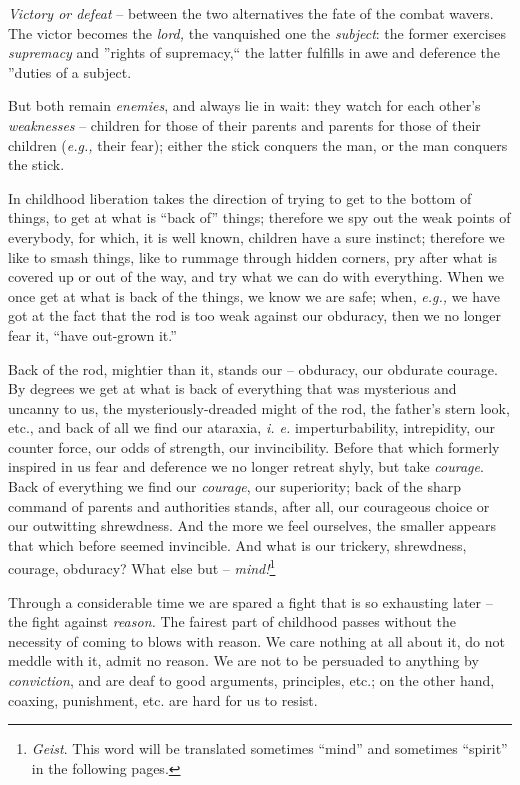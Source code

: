 \documentclass[12pt,a4paper]{book}
\begin{document}
\textit{Victory or defeat} -- between the two alternatives the fate of the 
combat wavers. The victor becomes the \textit{lord,} the vanquished one the 
\textit{subject}: the former exercises \textit{supremacy} and ''rights of 
supremacy,`` the latter fulfills in awe and deference the ''duties of a 
subject.

But both remain \textit{enemies}, and always lie in wait: they watch for each 
other's \textit{weaknesses} -- children for those of their parents and parents 
for those of their children (\textit{e.g.,} their fear); either the stick 
conquers the man, or the man conquers the stick.

In childhood liberation takes the direction of trying to get to the bottom of 
things, to get at what is ``back of'' things; therefore we spy out the weak 
points of everybody, for which, it is well known, children have a sure 
instinct; therefore we like to smash things, like to rummage through hidden 
corners, pry after what is covered up or out of the way, and try what we can 
do with everything. When we once get at what is back of the things, we know we 
are safe; when, \textit{e.g.,} we have got at the fact that the rod is too 
weak against our obduracy, then we no longer fear it, ``have out-grown it.''

Back of the rod, mightier than it, stands our -- obduracy, our obdurate 
courage. By degrees we get at what is back of everything that was mysterious 
and uncanny to us, the mysteriously-dreaded might of the rod, the father's 
stern look, etc., and back of all we find our ataraxia, \textit{i. e.} 
imperturbability, intrepidity, our counter force, our odds of strength, our 
invincibility. Before that which formerly inspired in us fear and deference we 
no longer retreat shyly, but take \textit{courage}. Back of everything we find 
our \textit{courage}, our superiority; back of the sharp command of parents 
and authorities stands, after all, our courageous choice or our outwitting 
shrewdness. And the more we feel ourselves, the smaller appears that which 
before seemed invincible. And what is our trickery, shrewdness, courage, 
obduracy? What else but -- \textit{mind!}\footnote{\textit{Geist}. This word 
will be translated sometimes ``mind'' and sometimes ``spirit'' in the 
following pages.}

Through a considerable time we are spared a fight that is so exhausting later 
-- the fight against \textit{reason.} The fairest part of childhood passes 
without the necessity of coming to blows with reason. We care nothing at all 
about it, do not meddle with it, admit no reason. We are not to be persuaded 
to anything by \textit{conviction}, and are deaf to good arguments, 
principles, etc.; on the other hand, coaxing, punishment, etc. are hard for us 
to resist.
\end{document}
